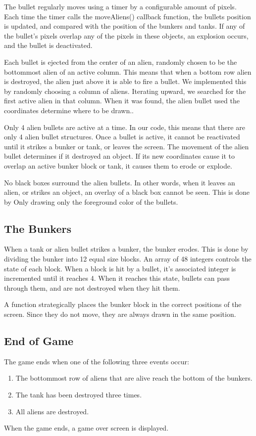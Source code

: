 \documentclass[11pt,letter,oneside]{report}
\begin{document}
The bullet regularly moves using a timer by a configurable amount of pixels. Each time the timer calls the moveAliens() callback function, the bullets position is updated, and compared with the position of the bunkers and tanks. If any of the bullet's pixels overlap any of the pixels in these objects, an explosion occurs, and the bullet is deactivated.

Each bullet is ejected from the center of an alien, randomly chosen to be the bottommost alien of an active column. This means that when a bottom row alien is destroyed, the alien just above it is able to fire a bullet. We implemented this by randomly choosing a column of aliens. Iterating upward, we searched for the first active alien in that column. When it was found, the alien bullet used the coordinates determine where to be drawn..

Only 4 alien bullets are active at a time. In our code, this means that there are only 4 alien bullet structures. Once a bullet is active, it cannot be reactivated until it strikes a bunker or tank, or leaves the screen. The movement of the alien bullet determines if it destroyed an object. If its new coordinates cause it to overlap an active bunker block or tank, it causes them to erode or explode.

No black boxes surround the alien bullets. In other words, when it leaves an alien, or strikes an object, an overlay of a black box cannot be seen. This is done by Only drawing only the foreground color of the bullets.

\subsection{The Bunkers}

When a tank or alien bullet strikes a bunker, the bunker erodes. This is done by dividing the bunker into 12 equal size blocks. An array of 48 integers controls the state of each block. When a block is hit by a bullet, it's associated integer is incremented until it reaches 4. When it reaches this state, bullets can pass through them, and are not destroyed when they hit them.

A function strategically places the bunker block in the correct positions of the screen. Since they do not move, they are always drawn in the same position.

\subsection{End of Game}
The game ends when one of the following three events occur:
\begin{enumerate}
\item The bottommost row of aliens that are alive reach the bottom of the bunkers.
\item The tank has been destroyed three times.
\item All aliens are destroyed.
\end{enumerate}
When the game ends, a game over screen is displayed.
\end{document}
